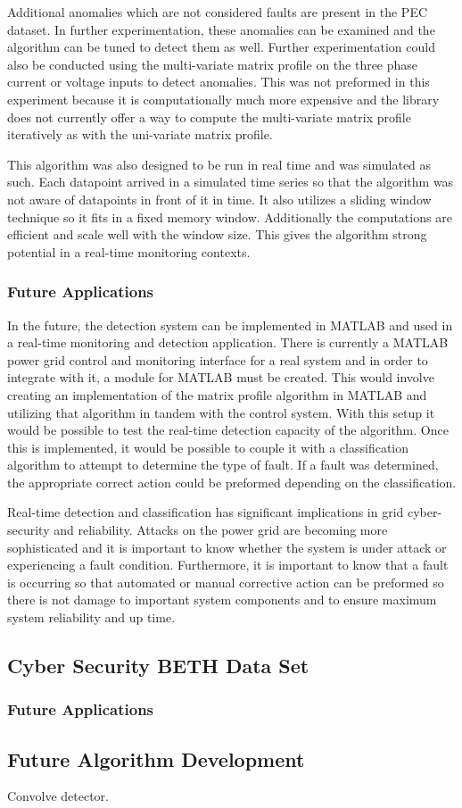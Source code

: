 Additional anomalies which are not considered faults are present in the PEC dataset. In further experimentation, these anomalies can be examined and the algorithm can be tuned to detect them as well. Further experimentation could also be conducted using the multi-variate matrix profile on the three phase current or voltage inputs to detect anomalies. This was not preformed in this experiment because it is computationally much more expensive and the library does not currently offer a way to compute the multi-variate matrix profile iteratively as with the uni-variate matrix profile.

This algorithm was also designed to be run in real time and was simulated as such. Each datapoint arrived in a simulated time series so that the algorithm was not aware of datapoints in front of it in time. It also utilizes a sliding window technique so it fits in a fixed memory window. Additionally the computations are efficient and scale well with the window size. This gives the algorithm strong potential in a real-time monitoring contexts.

\subsubsection{Future Applications}
In the future, the detection system can be implemented in MATLAB and used in a real-time monitoring and detection application. There is currently a MATLAB power grid control and monitoring interface for a real system and in order to integrate with it, a module for MATLAB must be created. This would involve creating an implementation of the matrix profile algorithm in MATLAB and utilizing that algorithm in tandem with the control system. With this setup it would be possible to test the real-time detection capacity of the algorithm. Once this is implemented, it would be possible to couple it with a classification algorithm to attempt to determine the type of fault. If a fault was determined, the appropriate correct action could be preformed depending on the classification. 

Real-time detection and classification has significant implications in grid cyber-security and reliability. Attacks on the power grid are becoming more sophisticated and it is important to know whether the system is under attack or experiencing a fault condition. Furthermore, it is important to know that a fault is occurring so that automated or manual corrective action can be preformed so there is not damage to important system components and to ensure maximum system reliability and up time.

\subsection{Cyber Security BETH Data Set}

\subsubsection{Future Applications}

\subsection{Future Algorithm Development}

Convolve detector.

